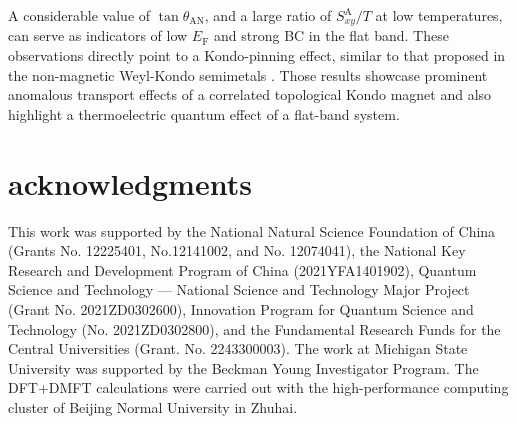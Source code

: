 \documentclass[aps,prl,preprint,superscriptaddress]{revtex4-2}
\begin{document}
A considerable value of $\tan\theta_{\mathrm{AN}}$, and a large ratio of $S^{\mathrm{A}}_{xy}/T$ at low temperatures, can serve as indicators of low $E_{\mathrm{F}}$ and strong BC in the flat band.
These observations directly point to a Kondo-pinning effect, similar to that proposed in the non-magnetic Weyl-Kondo semimetals \cite{Chen2022topocorre}.
Those results showcase prominent anomalous transport effects of a correlated topological Kondo magnet and also highlight a thermoelectric quantum effect of a flat-band system.







\vspace{10pt}

\section*{acknowledgments}
This work was supported by the National Natural Science Foundation of China (Grants No. 12225401, No.12141002, and No. 12074041), the National Key Research and Development Program of China (2021YFA1401902), Quantum Science and Technology --- National Science and Technology Major Project (Grant No. 2021ZD0302600), Innovation Program for Quantum Science and Technology (No. 2021ZD0302800), and the Fundamental Research Funds for the Central Universities (Grant. No. 2243300003). The work at Michigan State University was supported by the Beckman Young Investigator Program. The DFT+DMFT calculations were carried out with the high-performance computing cluster of Beijing Normal University in Zhuhai.






\end{document}
